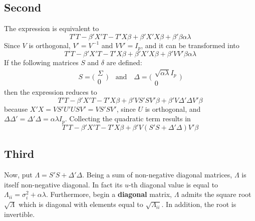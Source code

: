 \documentclass[a4paper]{article}
\begin{document}

\subsection*{Second} %
\label{sub:second}

The expression is equivalent to
\[T'T - \beta'X'T - T'X\beta + \beta'X'X\beta + \beta'\beta \alpha\lambda \]
Since $V$ is orthogonal, $V'=V^{-1}$ and $VV' = I_p$, and it can be transformed into
\[T'T - \beta'X'T - T'X\beta + \beta'X'X\beta + \beta'VV'\beta \alpha\lambda \]
If the following matrices $S$ and $\delta$ are defined:
\[S = \bigg(\begin{matrix} \Sigma \\ 0 \end{matrix}\bigg)\quad\text{and}\quad \Delta = \bigg(\begin{matrix} \sqrt{\alpha \lambda}I_p \\ 0 \end{matrix}\bigg)\]
then the expression reduces to
\[T'T - \beta'X'T - T'X\beta + \beta'VS'SV'\beta + \beta'V \Delta' \Delta V'\beta \]
because $X'X = VS'U'USV' = VS'SV'$, since $U$ is orthogonal, and $\Delta\Delta' = \Delta'\Delta = \alpha\lambda I_p$.
Collecting the quadratic term results in
\[T'T - \beta'X'T - T'X\beta + \beta'V(S'S+\Delta'\Delta)V'\beta \]


\subsection*{Third} %
\label{sub:third}

Now, put $\Lambda = S'S+\Delta'\Delta$. Being a sum of non-negative diagonal matrices, $\Lambda$ is itself non-negative diagonal. In fact its $u$-th diagonal value is equal to $\Lambda_{ii} = \sigma_i^2 + \alpha \lambda$. Furthermore, begin a \textbf{diagonal} matrix, $\Lambda$ admits the square root $\sqrt{\Lambda}$ which is diagonal with elements equal to $\sqrt{\Lambda_{ii}}$. In addition, the root is invertible.
\end{document}
